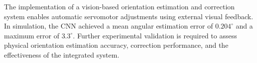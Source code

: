 \documentclass[lettersize,journal]{IEEEtran}
\begin{document}
	The implementation of a vision-based orientation estimation
	and correction system enables automatic servomotor
	adjustments using external visual feedback. In simulation,
	the CNN achieved a mean angular estimation error of
	$0.204^\circ$ and a maximum error of $3.3^\circ$.
	Further experimental validation is required to assess
	physical orientation estimation accuracy, correction
	performance, and the effectiveness of the integrated system.
		
	\balance
	
	
	
	
\end{document}
